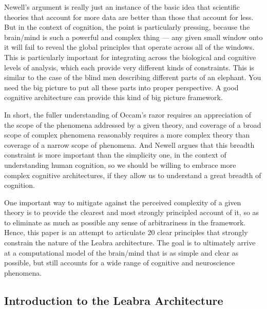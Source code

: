\documentclass[11pt,twoside]{article}
\begin{document}
Newell's argument is really just an instance of the basic idea that scientific
theories that account for more data are better than those that account for
less.  But in the context of cognition, the point is particularly pressing,
because the brain/mind is such a powerful and complex thing --- any given
small window onto it will fail to reveal the global principles that operate
across all of the windows.  This is particularly important for integrating
across the biological and cognitive levels of analysis, which each provide
very different kinds of constraints.  This is similar to the case of the blind
men describing different parts of an elephant.  You need the big picture to
put all these parts into proper perspective.  A good cognitive architecture
can provide this kind of big picture framework.

In short, the fuller understanding of Occam's razor requires an appreciation
of the scope of the phenomena addressed by a given theory, and coverage of a
broad scope of complex phenomena reasonably requires a more complex theory
than coverage of a narrow scope of phenomena.  And Newell argues that this
breadth constraint is more important than the simplicity one, in the context
of understanding human cognition, so we should be willing to embrace more
complex cognitive architectures, if they allow us to understand a great
breadth of cognition.

One important way to mitigate against the perceived complexity of a given
theory is to provide the clearest and most strongly principled account of it,
so as to eliminate as much as possible any sense of arbitrariness in the
framework.  Hence, this paper is an attempt to articulate 20 clear principles
that strongly constrain the nature of the Leabra architecture.  The goal is to
ultimately arrive at a computational model of the brain/mind that is as simple
and clear as possible, but still accounts for a wide range of cognitive and
neuroscience phenomena.

\subsection{Introduction to the Leabra Architecture}
\end{document}
